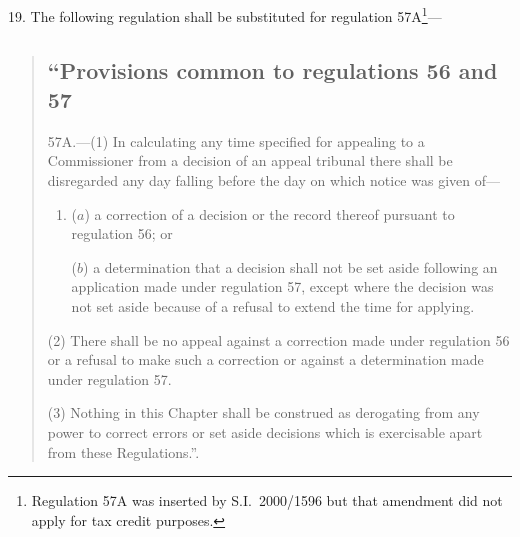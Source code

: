 \documentclass[12pt,a4paper]{article}
\begin{document}
\medskip

19.  The following regulation shall be substituted for regulation 57A\footnote{Regulation 57A was inserted by S.I.\ 2000/1596 but that amendment did not apply for tax credit purposes.}—
\begin{quotation}
\subsection*{“Provisions common to regulations 56 and 57}

57A.---(1)  In calculating any time specified for appealing to a Commissioner from a decision of an appeal tribunal there shall be disregarded any day falling before the day on which notice was given of—
\begin{enumerate}\item[]
($a$) a correction of a decision or the record thereof pursuant to regulation 56; or

($b$) a determination that a decision shall not be set aside following an application made under regulation 57, except where the decision was not set aside because of a refusal to extend the time for applying.
\end{enumerate}

(2) There shall be no appeal against a correction made under regulation 56 or a refusal to make such a correction or against a determination made under regulation 57.

(3) Nothing in this Chapter shall be construed as derogating from any power to correct errors or set aside decisions which is exercisable apart from these Regulations.”.
\end{quotation}

\medskip
\end{document}
